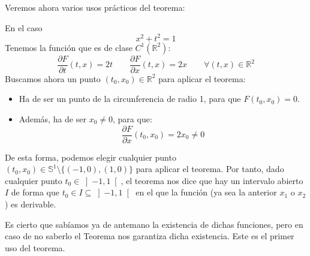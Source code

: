 Veremos ahora varios usos prácticos del teorema:
\begin{ejemplo}
    En el caso
    \begin{equation*}
        x^2+t^2 = 1
    \end{equation*}
    Tenemos la función 
    que es de clase $C^1(\mathbb{R}^2)$:
    \begin{equation*}
        \dfrac{\partial F}{\partial t}(t,x) = 2t \qquad \dfrac{\partial F}{\partial x}(t,x) = 2x \qquad \forall (t,x)\in \mathbb{R}^2
    \end{equation*}
    Buscamos ahora un punto $(t_0,x_0)\in \mathbb{R}^2$ para aplicar el teorema:
    \begin{itemize}
        \item Ha de ser un punto de la circunferencia de radio 1, para que $F(t_0,x_0)=0$.
        \item Además, ha de ser $x_0 \neq 0$, para que:
            \begin{equation*}
                \dfrac{\partial F}{\partial x}(t_0,x_0) = 2x_0 \neq 0
            \end{equation*}
    \end{itemize}
    De esta forma, podemos elegir cualquier punto $(t_0,x_0)\in \mathbb{S}^1\setminus \{(-1,0),(1,0)\}$ para aplicar el teorema. Por tanto, dado cualquier punto $t_0\in \left]-1,1\right[$, el teorema nos dice que hay un intervalo abierto $I$ de forma que $t_0\in I \subseteq \left]-1,1\right[$ en el que la función (ya sea la anterior $x_1$ o $x_2$) es derivable.

    Es cierto que sabíamos ya de antemano la existencia de dichas funciones, pero en caso de no saberlo el Teorema nos garantiza dicha existencia. Este es el primer uso del teorema.
\end{ejemplo}

